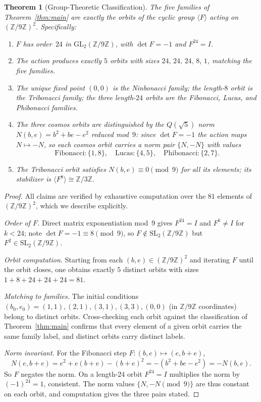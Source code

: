 \documentclass[12pt]{article}
\newtheorem{theorem}{Theorem}
\begin{document}
\begin{theorem}[Group-Theoretic Classification]\label{thm:orbits}
The five families of Theorem~\ref{thm:main} are exactly the orbits of the cyclic group $\langle F\rangle$ acting on $(\mathbb{Z}/9\mathbb{Z})^2$.  Specifically:
\begin{enumerate}
\item $F$ has order~$24$ in $\mathrm{GL}_2(\mathbb{Z}/9\mathbb{Z})$, with $\det F = -1$ and $F^{24} = I$.
\item The action produces exactly $5$ orbits with sizes $24,\,24,\,24,\,8,\,1$, matching the five families.
\item The unique fixed point $(0,0)$ is the Ninbonacci family; the length-$8$ orbit is the Tribonacci family; the three length-$24$ orbits are the Fibonacci, Lucas, and Phibonacci families.
\item The three cosmos orbits are distinguished by the \emph{$Q(\sqrt{5})$ norm} $N(b,e)=b^2+be-e^2$ reduced mod~$9$: since $\det F=-1$ the action maps $N\mapsto -N$, so each cosmos orbit carries a norm pair $\{N,-N\}$ with values
\[
  \text{Fibonacci}: \{1,8\},\quad \text{Lucas}: \{4,5\},\quad \text{Phibonacci}: \{2,7\}.
\]
\item The Tribonacci orbit satisfies $N(b,e)\equiv 0\pmod{9}$ for all its elements; its stabilizer is $\langle F^8\rangle\cong\mathbb{Z}/3\mathbb{Z}$.
\end{enumerate}
\end{theorem}

\begin{proof}
All claims are verified by exhaustive computation over the $81$ elements of $(\mathbb{Z}/9\mathbb{Z})^2$, which we describe explicitly.

\emph{Order of $F$.}  Direct matrix exponentiation mod~9 gives $F^{24}=I$ and $F^k\neq I$ for $k<24$; note $\det F = -1\equiv 8\pmod{9}$, so $F\notin\mathrm{SL}_2(\mathbb{Z}/9\mathbb{Z})$ but $F^2\in\mathrm{SL}_2(\mathbb{Z}/9\mathbb{Z})$.

\emph{Orbit computation.}  Starting from each $(b,e)\in(\mathbb{Z}/9\mathbb{Z})^2$ and iterating $F$ until the orbit closes, one obtains exactly $5$ distinct orbits with sizes $1+8+24+24+24=81$.

\emph{Matching to families.}  The initial conditions $(b_0,e_0)=(1,1),(2,1),(3,1),(3,3),(0,0)$ (in $\mathbb{Z}/9\mathbb{Z}$ coordinates) belong to distinct orbits.  Cross-checking each orbit against the classification of Theorem~\ref{thm:main} confirms that every element of a given orbit carries the same family label, and distinct orbits carry distinct labels.

\emph{Norm invariant.}  For the Fibonacci step $F:(b,e)\mapsto(e,b+e)$,
\[
  N(e,b+e) = e^2+e(b+e)-(b+e)^2 = -(b^2+be-e^2) = -N(b,e).
\]
So $F$ negates the norm.  On a length-$24$ orbit $F^{24}=I$ multiplies the norm by $(-1)^{24}=1$, consistent.  The norm values $\{N,-N\pmod{9}\}$ are thus constant on each orbit, and computation gives the three pairs stated.
\end{proof}
\end{document}
